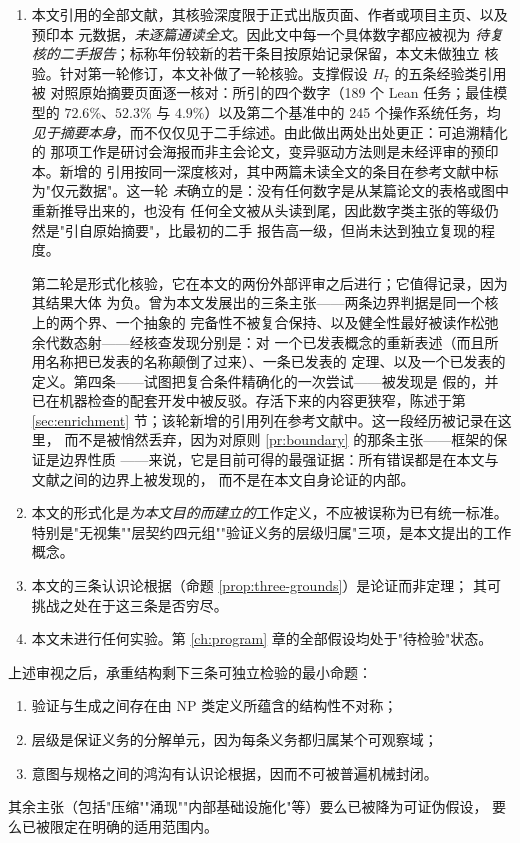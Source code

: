 \begin{enumerate}[label=(L\arabic*)]
\item 本文引用的全部文献，其核验深度限于正式出版页面、作者或项目主页、以及预印本
      元数据，\emph{未逐篇通读全文}。因此文中每一个具体数字都应被视为
      \emph{待复核的二手报告}；标称年份较新的若干条目按原始记录保留，本文未做独立
      核验。针对第一轮修订，本文补做了一轮核验。支撑假设 $H_7$ 的五条经验类引用被
      对照原始摘要页面逐一核对：所引的四个数字（189 个 Lean 任务；最佳模型的
      $72.6\%$、$52.3\%$ 与 $4.9\%$）以及第二个基准中的 245 个操作系统任务，均
      \emph{见于摘要本身}，而不仅仅见于二手综述。由此做出两处出处更正：可追溯精化的
      那项工作是研讨会海报而非主会论文，变异驱动方法则是未经评审的预印本。新增的
      引用按同一深度核对，其中两篇未读全文的条目在参考文献中标为"仅元数据"。这一轮
      \emph{未}确立的是：没有任何数字是从某篇论文的表格或图中重新推导出来的，也没有
      任何全文被从头读到尾，因此数字类主张的等级仍然是"引自原始摘要"，比最初的二手
      报告高一级，但尚未达到独立复现的程度。

      第二轮是形式化核验，它在本文的两份外部评审之后进行；它值得记录，因为其结果大体
      为负。曾为本文发展出的三条主张——两条边界判据是同一个核上的两个界、一个抽象的
      完备性不被复合保持、以及健全性最好被读作松弛余代数态射——经核查发现分别是：对
      一个已发表概念的重新表述（而且所用名称把已发表的名称颠倒了过来）、一条已发表的
      定理、以及一个已发表的定义。第四条——试图把复合条件精确化的一次尝试——被发现是
      假的，并已在机器检查的配套开发中被反驳。存活下来的内容更狭窄，陈述于第
      \ref{sec:enrichment} 节；该轮新增的引用列在参考文献中。这一段经历被记录在这里，
      而不是被悄然丢弃，因为对原则 \ref{pr:boundary} 的那条主张——框架的保证是边界性质
      ——来说，它是目前可得的最强证据：所有错误都是在本文与文献之间的边界上被发现的，
      而不是在本文自身论证的内部。
\item 本文的形式化是\emph{为本文目的而建立的}工作定义，不应被误称为已有统一标准。
      特别是"无视集""层契约四元组""验证义务的层级归属"三项，是本文提出的工作
      概念。
\item 本文的三条认识论根据（命题 \ref{prop:three-grounds}）是论证而非定理；
      其可挑战之处在于这三条是否穷尽。
\item 本文未进行任何实验。第 \ref{ch:program} 章的全部假设均处于"待检验"状态。
\end{enumerate}

\begin{principle}[自查结论]\label{pr:self-audit}
上述审视之后，承重结构剩下三条可独立检验的最小命题：
\begin{enumerate}[label=(\roman*)]
\item 验证与生成之间存在由 $\mathrm{NP}$ 类定义所蕴含的结构性不对称；
\item 层级是保证义务的分解单元，因为每条义务都归属某个可观察域；
\item 意图与规格之间的鸿沟有认识论根据，因而不可被普遍机械封闭。
\end{enumerate}
其余主张（包括"压缩""涌现""内部基础设施化"等）要么已被降为可证伪假设，
要么已被限定在明确的适用范围内。
\end{principle}
